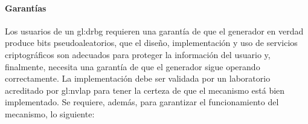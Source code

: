 %
%
\paragraph{Garantías}

Los usuarios de un \gls{gl:drbg} requieren una garantía de que el generador
en verdad produce bits pseudoaleatorios, que el diseño, implementación y uso
de servicios criptográficos son adecuados para proteger la información del
usuario y, finalmente, necesita una garantía de que el generador sigue
operando correctamente. La implementación debe ser validada por un laboratorio
acreditado por \gls{gl:nvlap} para tener la certeza de que el mecanismo está
bien implementado. Se requiere, además, para garantizar el funcionamiento del
mecanismo, lo siguiente:
